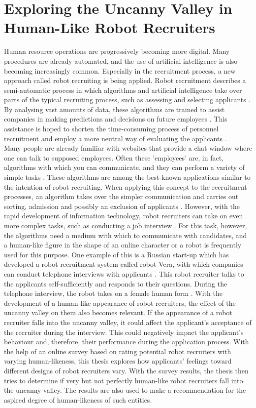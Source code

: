\chapter{Exploring the Uncanny Valley in Human-Like Robot Recruiters}
\label{chap:6}
Human resource operations are progressively becoming more digital. Many procedures are already automated, and the use of artificial intelligence is also becoming increasingly common. Especially in the recruitment process, a new approach called robot recruiting is being applied. Robot recruitment describes a semi-automatic process in which algorithms and artificial intelligence take over parts of the typical recruiting process, such as assessing and selecting applicants \cite{vera}. By analysing vast amounts of data, these algorithms are trained to assist companies in making predictions and decisions on future employees \cite{robot_recruiting_scholar}. This assistance is hoped to shorten the time-consuming process of personnel recruitment and employ a more neutral way of evaluating the applicants \cite{robot_recruiting_scholar}.\\
Many people are already familiar with websites that provide a chat window where one can talk to supposed employees. Often these 'employees' are, in fact, algorithms with which you can communicate, and they can perform a variety of simple tasks \cite{vera}. These algorithms are among the best-known applications similar to the intention of robot recruiting. When applying this concept to the recruitment processes, an algorithm takes over the simpler communication and carries out sorting, admission and possibly an exclusion of applicants \cite{vera}. However, with the rapid development of information technology, robot recruiters can take on even more complex tasks, such as conducting a job interview \cite{vera}. For this task, however, the algorithms need a medium with which to communicate with candidates, and a human-like figure in the shape of an online character or a robot is frequently used for this purpose. One example of this is a Russian start-up which has developed a robot recruitment system called robot Vera, with which companies can conduct telephone interviews with applicants \cite{vera}. This robot recruiter talks to the applicants self-sufficiently and responds to their questions. During the telephone interview, the robot takes on a female human form \cite{vera}.
With the development of a human-like appearance of robot recruiters, the effect of the uncanny valley on them also becomes relevant. If the appearance of a robot recruiter falls into the uncanny valley, it could affect the applicant's acceptance of the recruiter during the interview. This could negatively impact the applicant's behaviour and, therefore, their performance during the application process.
With the help of an online survey based on rating potential robot recruiters with varying human-likeness, this thesis explores how applicants' feelings toward different designs of robot recruiters vary. With the survey results, the thesis then tries to determine if very but not perfectly human-like robot recruiters fall into the uncanny valley. The results are also used to make a recommendation for the aspired degree of human-likeness of such entities. 

